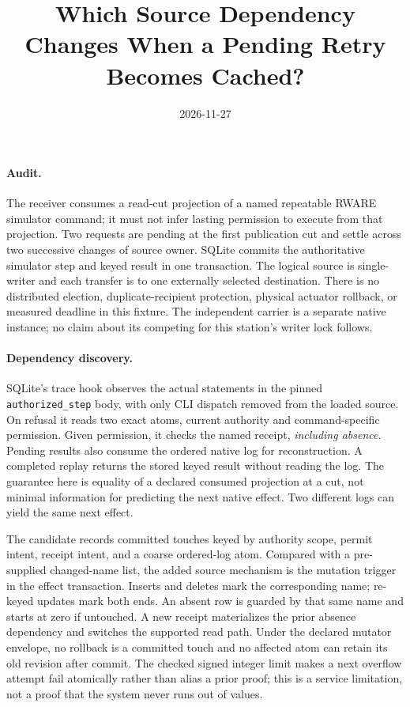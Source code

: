 \documentclass[11pt]{article}
\title{Which Source Dependency Changes When a Pending Retry Becomes Cached?}
\date{2026-11-27}
\begin{document}
\maketitle

\paragraph{Audit.}
The receiver consumes a read-cut projection of a named repeatable
RWARE simulator command; it must not infer lasting permission to
execute from that projection. Two requests are pending at the first
publication cut and settle across two successive changes of source
owner. SQLite commits the authoritative simulator step and keyed
result in one transaction. The logical source is single-writer and
each transfer is to one externally selected destination. There is
no distributed election, duplicate-recipient protection, physical
actuator rollback, or measured deadline in this fixture. The
independent carrier is a separate native instance; no claim about
its competing for this station's writer lock follows.

\paragraph{Dependency discovery.}
SQLite's trace hook observes the actual statements in the pinned
\texttt{authorized\_step} body, with only CLI dispatch removed from the
loaded source. On refusal it reads two exact atoms, current authority
and command-specific permission. Given permission, it checks the named
receipt, \emph{including absence}. Pending results also consume the ordered
native log for reconstruction. A completed replay returns the stored
keyed result without reading the log. The guarantee here is equality
of a declared consumed projection at a cut, not minimal information for
predicting the next native effect. Two different logs can yield the
same next effect.

The candidate records committed touches keyed by authority scope,
permit intent, receipt intent, and a coarse ordered-log atom.
Compared with a pre-supplied changed-name list, the added source
mechanism is the mutation trigger in the effect transaction. Inserts
and deletes mark the corresponding name; re-keyed updates mark
both ends. An absent row is guarded by that same name and starts at
zero if untouched. A new receipt materializes the prior absence
dependency and switches the supported read path. Under the declared
mutator envelope, no rollback is a committed touch and no affected
atom can retain its old revision after commit. The checked signed
integer limit makes a next overflow attempt fail atomically rather
than alias a prior proof; this is a service limitation, not a proof
that the system never runs out of values.
\end{document}

